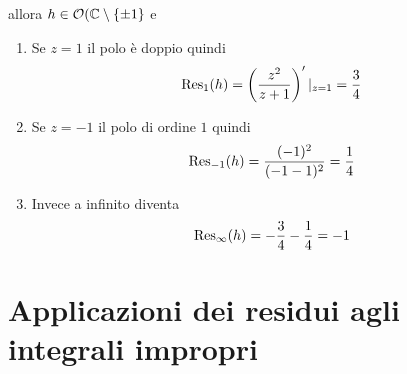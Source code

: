 \begin{example}
\begin{enumerate}
         allora $h \in \mathcal{O}(\mathbb{C} \setminus \left\{ \pm 1 \right\}$ e 
           \begin{enumerate}
             \item Se $z = 1$ il polo è doppio quindi 
               \begin{equation*}
                 \operatorname{Res}_1(h) = \left(\frac{z^2}{z+1}\right)'|_{z = 1} = \frac{3}{4}
               \end{equation*}
             \item Se $z = -1$ il polo di ordine $1$ quindi
               \begin{equation*}
                 \operatorname{Res}_{-1}(h) = \frac{(-1)^2}{(-1-1)^2} = \frac{1}{4} 
               \end{equation*}
             \item Invece a infinito diventa 
               \begin{equation*}
                 \operatorname{Res}_\infty(h) = - \frac{3}{4} - \frac{1}{4} = -1
               \end{equation*}
           \end{enumerate}
  \end{enumerate}
\end{example}


\section{Applicazioni dei residui agli integrali impropri}
